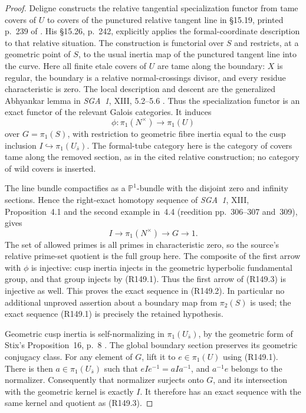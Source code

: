 \begin{proof}
Deligne constructs the relative tangential specialization functor
from tame covers of $U$ to covers of the punctured relative tangent
line in \S15.19, printed p.~239 of \cite{DeligneTangential1989}.
His \S15.26, p.~242, explicitly applies the formal-coordinate
description to that relative situation. The construction is
functorial over $S$ and restricts, at a geometric point of $S$, to
the usual inertia map of the punctured tangent line into the curve.
Here all finite etale covers of $U$ are tame along the boundary:
$X$ is regular, the boundary is a relative normal-crossings divisor,
and every residue characteristic is zero. The local description and
descent are the generalized Abhyankar lemma in \emph{SGA~1}, XIII,
5.2--5.6 \cite{SGA1}. Thus the specialization functor is an exact
functor of the relevant Galois categories. It induces
\[
 \phi:\pi_1(N^\times)\longrightarrow\pi_1(U)
\]
over $G=\pi_1(S)$, with restriction to geometric fibre inertia
equal to the cusp inclusion $I\hookrightarrow\pi_1(U_{\bar s})$.
The formal-tube category here is the category of covers tame along
the removed section, as in the cited relative construction; no
category of wild covers is inserted.

The line bundle compactifies as a $\mathbb P^1$-bundle with the
disjoint zero and infinity sections. Hence the right-exact homotopy
sequence of \emph{SGA~1}, XIII, Proposition~4.1 and the second
example in~4.4 (reedition pp.~306--307 and~309), gives
\[
 I\longrightarrow\pi_1(N^\times)\longrightarrow G
 \longrightarrow1.                                           \tag{R149.3}
\]
The set of allowed primes is all primes in characteristic zero,
so the source's relative prime-set quotient is the full group here.
The composite of the first arrow with $\phi$ is injective: cusp
inertia injects in the geometric hyperbolic fundamental group, and
that group injects by (R149.1). Thus the first arrow of (R149.3)
is injective as well. This proves the exact sequence in (R149.2).
In particular no additional unproved assertion about a boundary map
from $\pi_2(S)$ is used; the exact sequence (R149.1) is precisely
the retained hypothesis.

Geometric cusp inertia is self-normalizing in
$\pi_1(U_{\bar s})$, by the geometric form of Stix's
Proposition~16, p.~8 \cite{StixCuspidal2012}.
The global boundary section preserves its geometric conjugacy class.
For any element of $G$, lift it to $e\in\pi_1(U)$ using
(R149.1). There is then $a\in\pi_1(U_{\bar s})$ such that
$eIe^{-1}=aIa^{-1}$, and $a^{-1}e$ belongs to the normalizer.
Consequently that normalizer surjects onto $G$, and its intersection
with the geometric kernel is exactly $I$. It therefore has an exact
sequence with the same kernel and quotient as (R149.3).


\end{proof}
